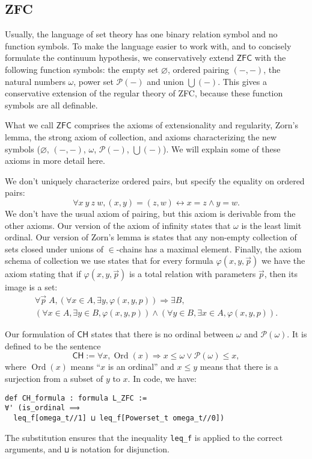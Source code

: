 \documentclass[sigplan,10pt,review, anonymous]{acmart}
\newcommand{\lil}{\lstinline}
\newcommand{\ZFC}{\mathsf{ZFC}}
\newcommand{\CH}{\mathsf{CH}}
\theoremstyle{definition}
\DeclareMathOperator{\Ord}{Ord}
\begin{document}
\subsection{ZFC}
\label{subsect:fol:zfc}

Usually, the language of set theory has one binary relation symbol and no function symbols.
To make the language easier to work with, and to concisely formulate the continuum hypothesis, we conservatively extend \(\ZFC\) with the following function symbols: the empty set \(\varnothing\), ordered pairing \(({-},{-})\), the natural numbers \(\omega\), power set \(\mathcal{P}({-})\) and union \(\bigcup({-})\).
This gives a conservative extension of the regular theory of ZFC, because these function symbols are all definable.

What we call \(\ZFC\) comprises the axioms of extensionality and regularity, Zorn's lemma, the strong axiom of collection, and axioms characterizing the new symbols (\(\varnothing\), \((-,-)\), \(\omega\), \(\mathcal{P}(-)\), \(\bigcup(-)\)). We will explain some of these axioms in more detail here.

We don't uniquely characterize ordered pairs, but specify the equality on ordered pairs:
\[\forall x\ y\ z\ w, (x,y)=(z,w) \leftrightarrow x = z \wedge y = w.\]
We don't have the usual axiom of pairing, but this axiom is derivable from the other axioms.
Our version of the axiom of infinity states that $\omega$ is the least limit ordinal.
Our version of Zorn's lemma is states that any non-empty collection of sets closed under unions of $\in$-chains has a maximal element.
Finally, the axiom schema of collection we use states that for every formula \(\varphi(x,y,\vec p)\) we have the axiom stating that if \(\varphi(x,y,\vec p)\) is a total relation with parameters \(\vec p\), then its image is a set:
\begin{gather*}
\forall \vec p\; A, (\forall x \in A, \exists y, \varphi(x,y,p)) \Rightarrow \exists B, \\
(\forall x \in A, \exists y \in B, \varphi(x,y,p)) \wedge
(\forall y \in B, \exists x \in A, \varphi(x,y,p)).
\end{gather*}

Our formulation of \(\CH\) states that there is no ordinal between \(\omega\) and \(\mathcal{P}(\omega)\). It is defined to be the sentence
\[\CH:=\forall x, \Ord(x) \Rightarrow x \le \omega \vee \mathcal{P}(\omega) \le x,\]
where \(\Ord(x)\) means ``\(x\) is an ordinal'' and \(x \le y\) means that there is a surjection from a subset of \(y\) to \(x\). In code, we have:
\begin{lstlisting}
def CH_formula : formula L_ZFC :=
∀' (is_ordinal ⟹
  leq_f[omega_t//1] ⊔ leq_f[Powerset_t omega_t//0])
\end{lstlisting}
The substitution ensures that the inequality \lil{leq_f} is applied to the correct arguments, and \lil{⊔} is notation for disjunction.
\end{document}
